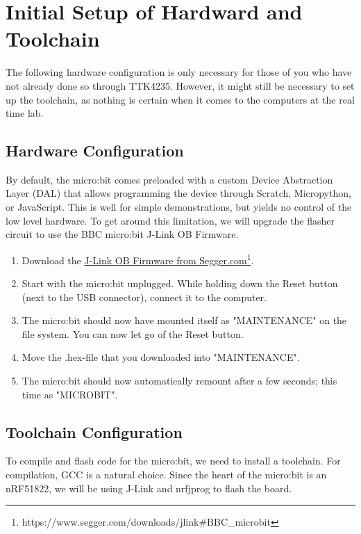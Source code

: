 \documentclass[11pt,a4paper]{article}
\begin{document}
\newpage
\noindent
\section{Initial Setup of Hardward and Toolchain}
The following hardware configuration is only necessary for those of you who have not already done so through TTK4235. However, it might still be necessary to set up the toolchain, as nothing is certain when it comes to the computers at the real time lab.

\subsection{Hardware Configuration}
By default, the micro:bit comes preloaded with a custom Device Abstraction Layer (DAL) that allows programming the device through Scratch, Micropython, or JavaScript. This is well for simple demonstrations, but yields no control of the low level hardware. To get around this limitation, we will upgrade the flasher circuit to use the BBC micro:bit J-Link OB Firmware.

\begin{enumerate}
\item Download the \href{https://www.segger.com/downloads/jlink#BBC\_microbit}{J-Link OB Firmware from Segger.com}\footnote{https://www.segger.com/downloads/jlink\#BBC\_microbit}.
\item Start with the micro:bit unplugged. While holding down the Reset button (next to the USB connector), connect it to the computer.
\item The micro:bit should now have mounted itself as "MAINTENANCE" on the file system. You can now let go of the Reset button.
\item Move the .hex-file that you downloaded into "MAINTENANCE".
\item The micro:bit should now automatically remount after a few seconds; this time as "MICROBIT".
\end{enumerate}

\subsection{Toolchain Configuration}
\label{sec::toolchain_config}
To compile and flash code for the micro:bit, we need to install a toolchain. For compilation, GCC is a natural choice. Since the heart of the micro:bit is an nRF51822, we will be using J-Link and nrfjprog to flash the board.
\end{document}

